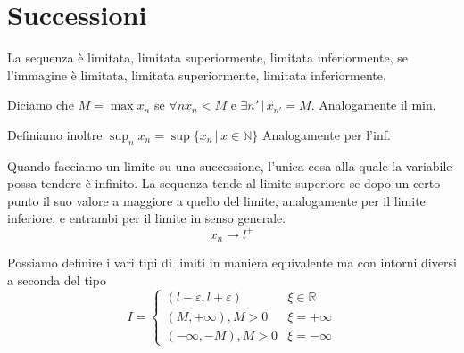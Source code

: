 \documentclass[a4paper]{article}
\begin{document}


\pagebreak

\section{Successioni}

La sequenza è limitata, limitata superiormente, limitata inferiormente,
se l'immagine è limitata, limitata superiormente, limitata inferiormente.

Diciamo che \(M=\max x_n\) se \(\forall n x_n < M\) e \(\exists n' \,|\, x_{n'} = M\).
Analogamente il min.

Definiamo inoltre \(\sup_{n} x_n = \sup \{ x_n \,|\, x \in \mathbb{N} \}\)
Analogamente per l'inf.

Quando facciamo un limite su una successione, l'unica cosa alla quale la variabile possa
tendere è infinito.
La sequenza tende al limite superiore se dopo un certo punto il suo valore a maggiore a quello del limite,
analogamente per il limite inferiore, e entrambi per il limite in senso generale.
\[
    x_n \to l^+
\]

Possiamo definire i vari tipi di limiti in maniera equivalente ma
con intorni diversi a seconda del tipo
\[
    I = \begin{cases}
        (l-\varepsilon, l+\varepsilon) & \xi \in \mathbb{R} \\
        (M, +\infty), M > 0 & \xi = +\infty \\
        (-\infty, -M), M > 0 & \xi = -\infty
    \end{cases}
\]
\end{document}

